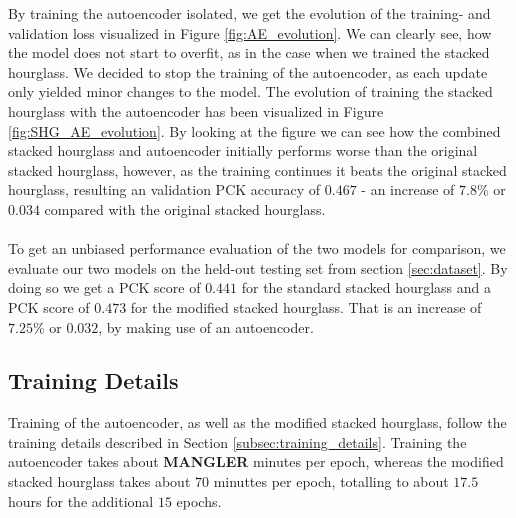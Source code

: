 \documentclass[./main.tex]{subfiles}
\begin{document}
\noindent By training the autoencoder isolated, we get the evolution of the training- and validation loss visualized in Figure \ref{fig:AE_evolution}. We can clearly see, how the model does not start to overfit, as in the case when we trained the stacked hourglass. We decided to stop the training of the autoencoder, as each update only yielded minor changes to the model. The evolution of training the stacked hourglass with the autoencoder has been visualized in Figure \ref{fig:SHG_AE_evolution}. By looking at the figure we can see how the combined stacked hourglass and autoencoder initially performs worse than the original stacked hourglass, however, as the training continues it beats the original stacked hourglass, resulting an validation PCK accuracy of $0.467$ - an increase of $7.8\%$ or $0.034$ compared with the original stacked hourglass.
\\
\\
To get an unbiased performance evaluation of the two models for comparison, we evaluate our two models on the held-out testing set from section \ref{sec:dataset}. By doing so we get a PCK score of $0.441$ for the standard stacked hourglass and a PCK score of $0.473$ for the modified stacked hourglass. That is an increase of $7.25\%$ or $0.032$, by making use of an autoencoder.


\subsection{Training Details}\label{subsec:improv_train}
Training of the autoencoder, as well as the modified stacked hourglass, follow the training details described in Section \ref{subsec:training_details}. Training the autoencoder takes about \textbf{MANGLER} minutes per epoch, whereas the modified stacked hourglass takes about $70$ minuttes per epoch, totalling to about $17.5$ hours for the additional $15$ epochs.
\end{document}
